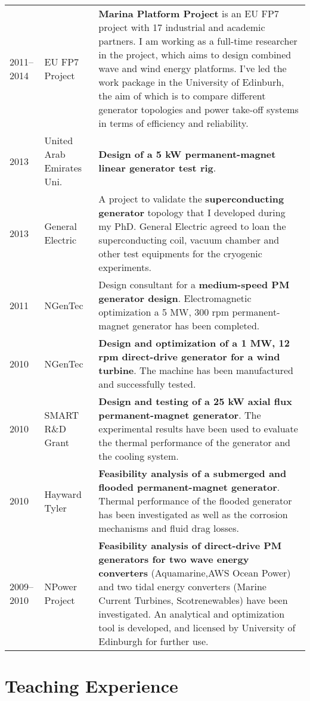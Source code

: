 \documentclass[a4paper,12pt]{article}
\begin{document}
\begin{longtable}{lp{3cm}p{12cm}}
2011--2014 & EU FP7 Project & \textbf{Marina Platform Project} is an EU FP7 project with 17 industrial and academic partners. I am working as a full-time researcher in the project, which aims to design combined wave and wind energy platforms. I've led the work package in the University of Edinburh, the aim of which is to compare different generator topologies and power take-off systems in terms of efficiency and reliability.\\
2013 & United Arab Emirates Uni. & \textbf{Design of a 5 kW permanent-magnet linear generator test rig}.\\
2013 & General Electric & A project to validate the \textbf{superconducting generator} topology that I developed during my PhD. General Electric agreed to loan the superconducting coil, vacuum chamber and other test equipments for the cryogenic experiments.\\
2011 & NGenTec & Design consultant for a \textbf{medium-speed PM generator design}. Electromagnetic optimization a 5 MW, 300 rpm permanent-magnet generator has been completed.\\
2010 & NGenTec & \textbf{Design and optimization of a 1 MW, 12 rpm direct-drive generator for a wind turbine}. The machine has been manufactured and successfully tested.\\
2010 & SMART R\&D Grant & \textbf{Design and testing of a 25 kW axial flux permanent-magnet generator}. The experimental results have been used to evaluate the thermal performance of the generator and the cooling system.\\
2010 & Hayward Tyler & \textbf{Feasibility analysis of a
submerged and flooded permanent-magnet generator}. Thermal performance of the flooded generator has been
investigated as well as the corrosion mechanisms and fluid drag losses.\\
2009--2010 & NPower Project & \textbf{Feasibility analysis of direct-drive PM generators for two wave energy converters} (Aquamarine,AWS Ocean Power) and two tidal energy converters (Marine Current Turbines, Scotrenewables) have been investigated. An analytical and optimization tool is developed, and licensed by University of Edinburgh for further use.\\

\end{longtable}

\section{Teaching Experience}
\end{document}
